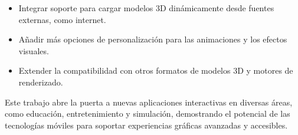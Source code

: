 \documentclass[conference]{IEEEtran}
\begin{document}
\begin{itemize}
    \item Integrar soporte para cargar modelos 3D dinámicamente desde fuentes externas, como internet.
    \item Añadir más opciones de personalización para las animaciones y los efectos visuales.
    \item Extender la compatibilidad con otros formatos de modelos 3D y motores de renderizado.
\end{itemize}

Este trabajo abre la puerta a nuevas aplicaciones interactivas en diversas áreas, como educación, entretenimiento y simulación, demostrando el potencial de las tecnologías móviles para soportar experiencias gráficas avanzadas y accesibles.


\printbibliography
\end{document}
